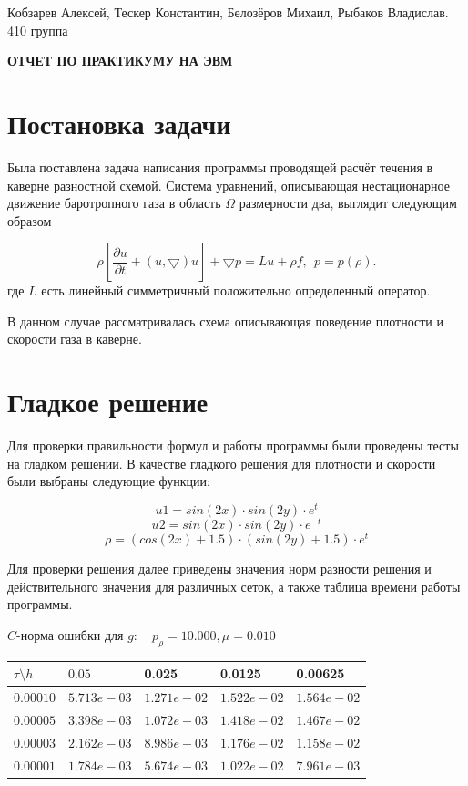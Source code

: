 \documentclass[a4paper, 25pt]{article}
\begin{document}
\begin{flushright}
Кобзарев Алексей, Тескер Константин, Белозёров Михаил, Рыбаков Владислав.
\\
410 группа
\end{flushright}

\begin{center}
\bfseries ОТЧЕТ ПО ПРАКТИКУМУ НА ЭВМ
\end{center}

\section{Постановка задачи}

Была поставлена задача написания программы проводящей расчёт течения в каверне разностной схемой. 
Система уравнений, описывающая нестационарное движение баротропного газа в область $\Omega$ размерности два, выглядит следующим образом

\begin{equation}
 \rho[\frac{\partial u}{\partial t} + (u, \bigtriangledown)u]  + \bigtriangledown p = Lu + \rho f, ~~
 p = p (\rho).
\end{equation}
где $L$ есть линейный симметричный положительно определенный оператор.

В данном случае рассматривалась схема описывающая поведение плотности и скорости газа в каверне.

\section{Гладкое решение}

Для проверки правильности формул и работы программы были проведены тесты на гладком решении. В качестве гладкого решения для плотности и скорости были выбраны следующие функции:

$$u1 = sin (2x) \cdot sin (2y) \cdot e^t$$
$$u2 = sin (2x) \cdot sin (2y) \cdot e^{-t}$$
$$\rho = (cos (2x) + 1.5) \cdot (sin (2y) + 1.5) \cdot e^t$$


Для проверки решения далее приведены значения норм разности решения и действительного значения для различных сеток, а также таблица времени работы программы.

\begin{center}
 $C$-норма ошибки для $g: \quad p_{\rho}=10.000, \mu = 0.010 $
\begin{tabular}{|p{0.6in}|p{0.7in}|p{0.7in}|p{0.7in}|p{0.7in}|} \hline
$\tau\setminus h$ & $0.05$ & 0.025& 0.0125 & 0.00625 \\ \hline
$0.00010$ & $5.713e-03$ &$1.271e-02$ &$1.522e-02$ &$1.564e-02$  \\ \hline
$0.00005$ & $3.398e-03$ &$1.072e-03$ &$1.418e-02$ &$1.467e-02$  \\ \hline
$0.00003$ & $2.162e-03$ &$8.986e-03$ &$1.176e-02$ &$1.158e-02$  \\ \hline
$0.00001$ & $1.784e-03$ &$5.674e-03$ &$1.022e-02$ &$7.961e-03$  \\ \hline
\end{tabular}\\[20pt]
\end{center}
\end{document}

